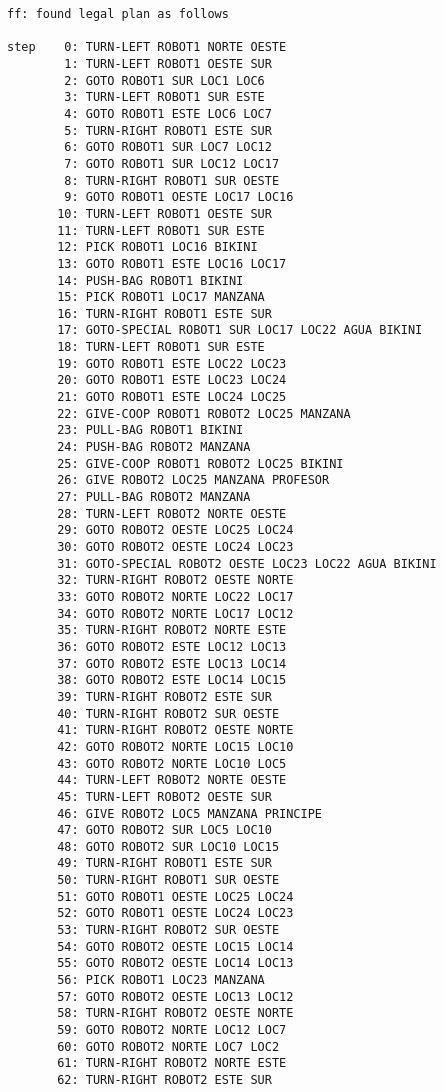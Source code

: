 \documentclass{article}
\begin{document}
\begin{lstlisting}
ff: found legal plan as follows

step    0: TURN-LEFT ROBOT1 NORTE OESTE
        1: TURN-LEFT ROBOT1 OESTE SUR
        2: GOTO ROBOT1 SUR LOC1 LOC6
        3: TURN-LEFT ROBOT1 SUR ESTE
        4: GOTO ROBOT1 ESTE LOC6 LOC7
        5: TURN-RIGHT ROBOT1 ESTE SUR
        6: GOTO ROBOT1 SUR LOC7 LOC12
        7: GOTO ROBOT1 SUR LOC12 LOC17
        8: TURN-RIGHT ROBOT1 SUR OESTE
        9: GOTO ROBOT1 OESTE LOC17 LOC16
       10: TURN-LEFT ROBOT1 OESTE SUR
       11: TURN-LEFT ROBOT1 SUR ESTE
       12: PICK ROBOT1 LOC16 BIKINI
       13: GOTO ROBOT1 ESTE LOC16 LOC17
       14: PUSH-BAG ROBOT1 BIKINI
       15: PICK ROBOT1 LOC17 MANZANA
       16: TURN-RIGHT ROBOT1 ESTE SUR
       17: GOTO-SPECIAL ROBOT1 SUR LOC17 LOC22 AGUA BIKINI
       18: TURN-LEFT ROBOT1 SUR ESTE
       19: GOTO ROBOT1 ESTE LOC22 LOC23
       20: GOTO ROBOT1 ESTE LOC23 LOC24
       21: GOTO ROBOT1 ESTE LOC24 LOC25
       22: GIVE-COOP ROBOT1 ROBOT2 LOC25 MANZANA
       23: PULL-BAG ROBOT1 BIKINI
       24: PUSH-BAG ROBOT2 MANZANA
       25: GIVE-COOP ROBOT1 ROBOT2 LOC25 BIKINI
       26: GIVE ROBOT2 LOC25 MANZANA PROFESOR
       27: PULL-BAG ROBOT2 MANZANA
       28: TURN-LEFT ROBOT2 NORTE OESTE
       29: GOTO ROBOT2 OESTE LOC25 LOC24
       30: GOTO ROBOT2 OESTE LOC24 LOC23
       31: GOTO-SPECIAL ROBOT2 OESTE LOC23 LOC22 AGUA BIKINI
       32: TURN-RIGHT ROBOT2 OESTE NORTE
       33: GOTO ROBOT2 NORTE LOC22 LOC17
       34: GOTO ROBOT2 NORTE LOC17 LOC12
       35: TURN-RIGHT ROBOT2 NORTE ESTE
       36: GOTO ROBOT2 ESTE LOC12 LOC13
       37: GOTO ROBOT2 ESTE LOC13 LOC14
       38: GOTO ROBOT2 ESTE LOC14 LOC15
       39: TURN-RIGHT ROBOT2 ESTE SUR
       40: TURN-RIGHT ROBOT2 SUR OESTE
       41: TURN-RIGHT ROBOT2 OESTE NORTE
       42: GOTO ROBOT2 NORTE LOC15 LOC10
       43: GOTO ROBOT2 NORTE LOC10 LOC5
       44: TURN-LEFT ROBOT2 NORTE OESTE
       45: TURN-LEFT ROBOT2 OESTE SUR
       46: GIVE ROBOT2 LOC5 MANZANA PRINCIPE
       47: GOTO ROBOT2 SUR LOC5 LOC10
       48: GOTO ROBOT2 SUR LOC10 LOC15
       49: TURN-RIGHT ROBOT1 ESTE SUR
       50: TURN-RIGHT ROBOT1 SUR OESTE
       51: GOTO ROBOT1 OESTE LOC25 LOC24
       52: GOTO ROBOT1 OESTE LOC24 LOC23
       53: TURN-RIGHT ROBOT2 SUR OESTE
       54: GOTO ROBOT2 OESTE LOC15 LOC14
       55: GOTO ROBOT2 OESTE LOC14 LOC13
       56: PICK ROBOT1 LOC23 MANZANA
       57: GOTO ROBOT2 OESTE LOC13 LOC12
       58: TURN-RIGHT ROBOT2 OESTE NORTE
       59: GOTO ROBOT2 NORTE LOC12 LOC7
       60: GOTO ROBOT2 NORTE LOC7 LOC2
       61: TURN-RIGHT ROBOT2 NORTE ESTE
       62: TURN-RIGHT ROBOT2 ESTE SUR

\end{lstlisting}
\end{document}
